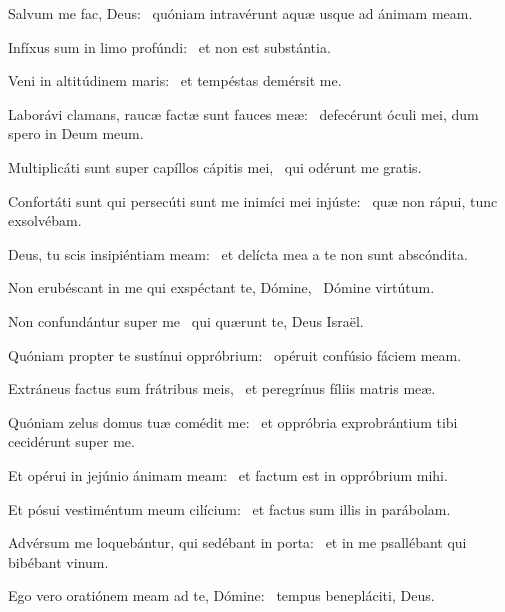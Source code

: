 \item Salvum me fac, Deus:~\psstar{} quóniam intravérunt aquæ usque ad ánimam meam.

\item Infíxus sum in limo profúndi:~\psstar{} et non est substántia.

\item Veni in altitúdinem maris:~\psstar{} et tempéstas demérsit me.

\item Laborávi clamans, raucæ factæ sunt fauces meæ:~\psstar{} defecérunt óculi mei, dum spero in Deum meum.

\item Multiplicáti sunt super capíllos cápitis mei,~\psstar{} qui odérunt me gratis.

\item Confortáti sunt qui persecúti sunt me inimíci mei injúste:~\psstar{} quæ non rápui, tunc exsolvébam.

\item Deus, tu scis insipiéntiam meam:~\psstar{} et delícta mea a te non sunt abscóndita.

\item Non erubéscant in me qui exspéctant te, Dómine,~\psstar{} Dómine virtútum.

\item Non confundántur super me~\psstar{} qui quærunt te, Deus Israël.

\item Quóniam propter te sustínui oppróbrium:~\psstar{} opéruit confúsio fáciem meam.

\item Extráneus factus sum frátribus meis,~\psstar{} et peregrínus fíliis matris meæ.

\item Quóniam zelus domus tuæ comédit me:~\psstar{} et oppróbria exprobrántium tibi cecidérunt super me.

\item Et opérui in jejúnio ánimam meam:~\psstar{} et factum est in oppróbrium mihi.

\item Et pósui vestiméntum meum cilícium:~\psstar{} et factus sum illis in parábolam.

\item Advérsum me loquebántur, qui sedébant in porta:~\psstar{} et in me psallébant qui bibébant vinum.

\item Ego vero oratiónem meam ad te, Dómine:~\psstar{} tempus benepláciti, Deus.


